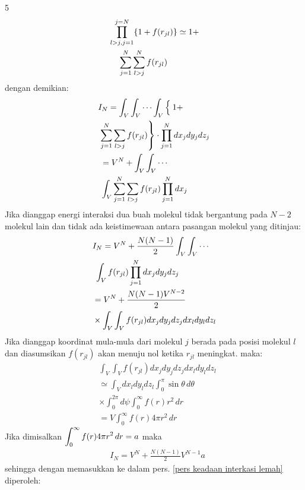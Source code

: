 \documentclass[a4paper  , 6 pt]{article}
\begin{document}
\begin{tiny}
\begin{multicols} {5}
\begin{align}
& \prod_{l> j , j = 1}^{j = N}  \{ 1 + f(r_{jl})\} \simeq 1 + \nonumber \\
& \hspace{0.4 cm} \sum_{j = 1}^N \sum_{l > j}^N f(r_{jl})
 \end{align}
 dengan demikian:
 \begin{align}
 & I_N = \int_V \int_V \cdots \int_V \left\{ \frac{}{} 1  + \right. \nonumber \\
 & \left.  \sum_{j= 1}^N \sum_{l > j} f(r_{jl }) \right \}  \cdot\prod_{j = 1}^N d x_j d y_j d z_j  \nonumber \\
 & \hspace{0.1 cm } = V^N + \int_V \int_V \cdots \nonumber \\
 & \hspace{0.1 cm } \int_V \sum_{j = 1}^N \sum_{l > j} f(r_{jl}) \prod_{j = 1}^N d x_j 
 \end{align}
 Jika dianggap energi interaksi dua buah molekul tidak bergantung pada $N - 2$ molekul lain dan tidak ada keistimewaan antara pasangan molekul yang ditinjau:
 \begin{align}
 & I_N  = V^N + \frac{N(N - 1)}{2} \int_V \int_V \cdots \nonumber \\
 & \hspace{0.1 cm} \int_V f(r_{jl}) \prod_{j = 1}^N dx_j dy_j d z_j \nonumber \\
 & = V^N + \frac{N (N - 1) V^{N - 2}}{2} \nonumber \\
 & \times \int_V \int_V f(r_{jl} ) d x_j d y_j d z_j d x_l dy_l d z_l 
 \end{align}
 Jika dianggap koordinat mula-mula dari molekul $j$ berada pada posisi molekul $l$ dan diasumsikan  $f(r_{jl})$ akan menuju nol ketika $r_{jl}$ meningkat. maka:
 \begin{align}
 & \int_V \int_V f(r_{jl }) dx_j dy_j dz_j d x_l d y_l d z_l \nonumber \\
 & \simeq \int_V d x_l d y_l d z_l \int_0^\pi \sin \theta \, d\theta \nonumber \\
 & \times \int_0^{2 \pi} d \psi \int_0^\infty f(r) r^2 \, dr \nonumber \\
 & = V \int_{0}^{\infty} f (r) 4 \pi r^2 \, dr 
 \end{align}
 Jika dimisalkan $\displaystyle \int_0^\infty f(r) 4 \pi r^2 \, dr = a $ maka
 \begin{align}
 & I_N  =  V^N + \frac{N (N - 1) }{2 } V^{N - 1} a 
 \end{align}
 sehingga dengan memasukkan ke dalam pers. \ref{pers keadaan interkasi lemah} diperoleh:

\end{multicols}
\end{tiny}
\end{document}
